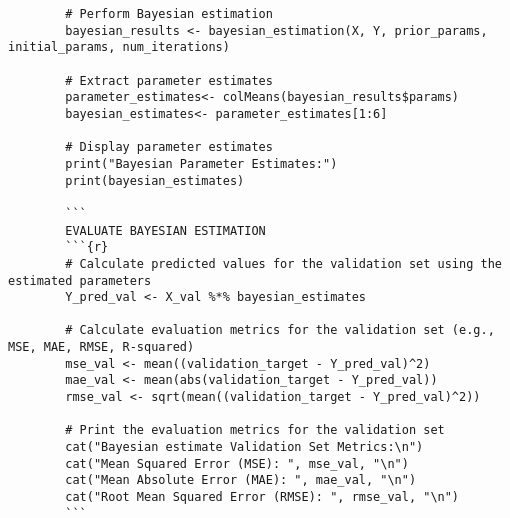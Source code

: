 \documentclass[12pt]{article}
\begin{document}
\begin{lstlisting}
		# Perform Bayesian estimation
		bayesian_results <- bayesian_estimation(X, Y, prior_params, initial_params, num_iterations)
		
		# Extract parameter estimates
		parameter_estimates<- colMeans(bayesian_results$params)
		bayesian_estimates<- parameter_estimates[1:6]
		
		# Display parameter estimates
		print("Bayesian Parameter Estimates:")
		print(bayesian_estimates)
		
		```
		EVALUATE BAYESIAN ESTIMATION
		```{r}
		# Calculate predicted values for the validation set using the estimated parameters
		Y_pred_val <- X_val %*% bayesian_estimates
		
		# Calculate evaluation metrics for the validation set (e.g., MSE, MAE, RMSE, R-squared)
		mse_val <- mean((validation_target - Y_pred_val)^2)
		mae_val <- mean(abs(validation_target - Y_pred_val))
		rmse_val <- sqrt(mean((validation_target - Y_pred_val)^2))
		
		# Print the evaluation metrics for the validation set
		cat("Bayesian estimate Validation Set Metrics:\n")
		cat("Mean Squared Error (MSE): ", mse_val, "\n")
		cat("Mean Absolute Error (MAE): ", mae_val, "\n")
		cat("Root Mean Squared Error (RMSE): ", rmse_val, "\n")
		```
		
	\end{lstlisting}
	
\end{document}
